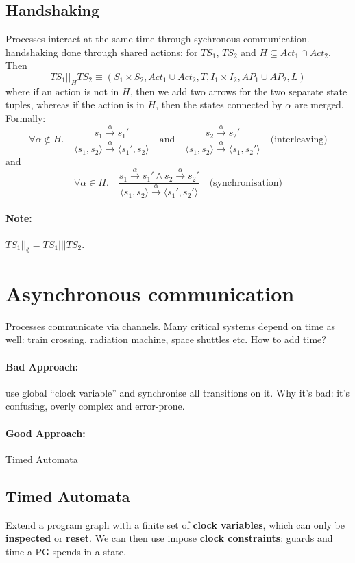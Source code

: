 \documentclass{article}
\begin{document}
\subsection{Handshaking}
Processes interact at the same time through sychronous communication.
handshaking done through shared actions: for $TS_1$, $TS_2$ and $H \subseteq
Act_1 \cap Act_2$. Then
\[
  TS_1 ||_H TS_2 \equiv (S_1 \times S_2, Act_1 \cup Act_2, T, I_1 \times I_2,
  AP_1 \cup AP_2, L)
\]
where if an action is not in $H$, then we add two arrows for the two separate
state tuples, whereas if the action is in $H$, then the states connected by
$\alpha$ are merged. Formally:
\[
  \forall \alpha \not\in H. \quad \frac{s_1 \xrightarrow{\alpha} s_1'}{\langle
    s_1, s_2 \rangle \xrightarrow{\alpha} \langle
    s_1', s_2 \rangle} \quad\text{and}\quad \frac{s_2 \xrightarrow{\alpha} s_2'}{\langle
    s_1, s_2 \rangle \xrightarrow{\alpha} \langle
    s_1, s_2' \rangle} \quad\text{(interleaving)}
\]
and
\[
  \forall \alpha \in H. \quad \frac{s_1 \xrightarrow{\alpha} s_1' \land s_2 \xrightarrow{\alpha} s_2'}{\langle
    s_1, s_2 \rangle \xrightarrow{\alpha} \langle
    s_1', s_2' \rangle}  \quad\text{(synchronisation)}
\]

\paragraph{Note:} $TS_1 ||_\emptyset = TS_1 ||| TS_2$.

\section{Asynchronous communication}
Processes communicate via channels.
Many critical systems depend on time as well: train crossing, radiation machine,
space shuttles etc.
How to add time?
\paragraph{Bad Approach:} use global ``clock variable'' and synchronise all
transitions on it. Why it's bad: it's confusing, overly complex and error-prone.
\paragraph{Good Approach:} Timed Automata
\subsection{Timed Automata}
Extend a program graph with a finite set of \textbf{clock variables}, which can
only be \textbf{inspected} or \textbf{reset}. We can then use impose
\textbf{clock constraints}: guards and time a PG spends in a state.
\end{document}

